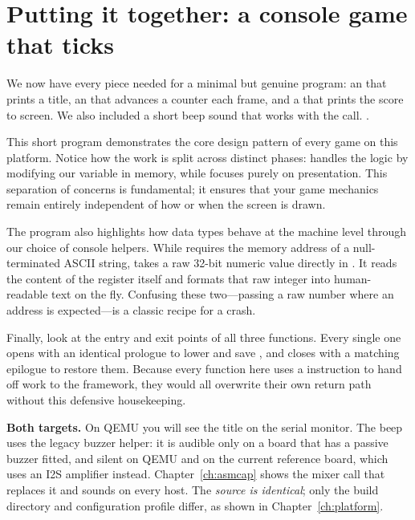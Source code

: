 \section{Putting it together: a console game that ticks}

We now have every piece needed for a minimal but genuine program: an 
that prints a title, an  that advances a counter each frame, and a
 that prints the score to screen.
We also included a short beep sound that works with the  call.
\citep{prg32tutorialascii}.



This short program demonstrates the core design pattern of every game on this platform. 
Notice how the work is split across distinct phases:  handles the logic 
by modifying our variable in memory, while  focuses purely on presentation. 
This separation of concerns is fundamental; it ensures that your game mechanics remain entirely 
independent of how or when the screen is drawn.

The program also highlights how data types behave at the machine level through our choice 
of console helpers. While  requires the memory address of a null-terminated 
ASCII string,  takes a raw 32-bit numeric value directly in . It 
reads the content of the register itself and formats that raw integer into human-readable text 
on the fly. Confusing these two---passing a raw number where an address is expected---is a classic 
recipe for a crash.

Finally, look at the entry and exit points of all three functions. Every single one opens 
with an identical prologue to lower  and save , and closes with a matching 
epilogue to restore them. Because every function here uses a  instruction to hand 
off work to the framework, they would all overwrite their own return path without this defensive 
housekeeping.

\begin{prgtargets}
\textbf{Both targets.} On QEMU you will see the title on the serial monitor. The
beep uses the legacy buzzer helper: it is audible only on a board that has a
passive buzzer fitted, and silent on QEMU and on the current reference board,
which uses an I2S amplifier instead. Chapter~\ref{ch:asmcap} shows the mixer
call that replaces it and sounds on every host. The
\emph{source is identical}; only the build directory and configuration profile
differ, as shown in Chapter~\ref{ch:platform}.
\end{prgtargets}


